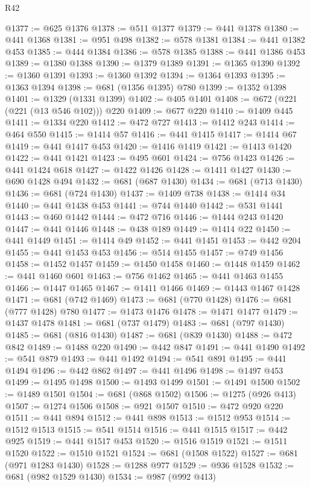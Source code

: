 \begin{lexlean}{R42}
\begin{coremodule}
@1377 := @625 @1376
@1378 := @511 @1377
@1379 := @441 @1378
@1380 := @441 @1368
@1381 := @951 @498
@1382 := @578 @1381
@1384 := @441 @1382 @453
@1385 := @444 @1384
@1386 := @578 @1385
@1388 := @441 @1386 @453
@1389 := @1380 @1388
@1390 := @1379 @1389
@1391 := @1365 @1390
@1392 := @1360 @1391
@1393 := @1360 @1392
@1394 := @1364 @1393
@1395 := @1363 @1394
@1398 := @681 (@1356 @1395) @780
@1399 := @1352 @1398
@1401 := @1329 (@1331 @1399)
@1402 := @405 @1401
@1408 := @672 (@221 (@221 (@13 @546 @102))) @220
@1409 := @677 @220
@1410 := @1409 @445
@1411 := @1334 @220
@1412 := @472 @727
@1413 := @1412 @243
@1414 := @464 @550
@1415 := @1414 @57
@1416 := @441 @1415
@1417 := @1414 @67
@1419 := @441 @1417 @453
@1420 := @1416 @1419
@1421 := @1413 @1420
@1422 := @441 @1421
@1423 := @495 @601
@1424 := @756 @1423
@1426 := @441 @1424 @618
@1427 := @1422 @1426
@1428 := @1411 @1427
@1430 := @690 @1428 @494
@1432 := @681 (@687 @1430)
@1434 := @681 (@713 @1430)
@1436 := @681 (@724 @1430)
@1437 := @1409 @738
@1438 := @1414 @34
@1440 := @441 @1438 @453
@1441 := @744 @1440
@1442 := @531 @1441
@1443 := @460 @1442
@1444 := @472 @716
@1446 := @1444 @243 @1420
@1447 := @441 @1446
@1448 := @438 @189
@1449 := @1414 @22
@1450 := @441 @1449
@1451 := @1414 @49
@1452 := @441 @1451
@1453 := @442 @204
@1455 := @441 @1453 @453
@1456 := @514 @1455
@1457 := @749 @1456
@1458 := @1452 @1457
@1459 := @1450 @1458
@1460 := @1448 @1459
@1462 := @441 @1460 @601
@1463 := @756 @1462
@1465 := @441 @1463 @1455
@1466 := @1447 @1465
@1467 := @1411 @1466
@1469 := @1443 @1467 @1428
@1471 := @681 (@742 @1469)
@1473 := @681 (@770 @1428)
@1476 := @681 (@777 @1428) @780
@1477 := @1473 @1476
@1478 := @1471 @1477
@1479 := @1437 @1478
@1481 := @681 (@737 @1479)
@1483 := @681 (@797 @1430)
@1485 := @681 (@816 @1430)
@1487 := @681 (@839 @1430)
@1488 := @472 @842
@1489 := @1488 @220
@1490 := @442 @847
@1491 := @441 @1490
@1492 := @541 @879
@1493 := @441 @1492
@1494 := @541 @891
@1495 := @441 @1494
@1496 := @442 @862
@1497 := @441 @1496
@1498 := @1497 @453
@1499 := @1495 @1498
@1500 := @1493 @1499
@1501 := @1491 @1500
@1502 := @1489 @1501
@1504 := @681 (@868 @1502)
@1506 := @1275 (@926 @413)
@1507 := @1274 @1506
@1508 := @921 @1507
@1510 := @472 @920 @220
@1511 := @441 @894
@1512 := @441 @898
@1513 := @1512 @953
@1514 := @1512 @1513
@1515 := @541 @1514
@1516 := @441 @1515
@1517 := @442 @925
@1519 := @441 @1517 @453
@1520 := @1516 @1519
@1521 := @1511 @1520
@1522 := @1510 @1521
@1524 := @681 (@1508 @1522)
@1527 := @681 (@971 @1283 @1430)
@1528 := @1288 @977
@1529 := @936 @1528
@1532 := @681 (@982 @1529 @1430)
@1534 := @987 (@992 @413)

\end{coremodule}
\end{lexlean}

